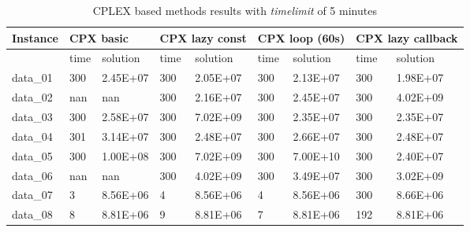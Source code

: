 \begin{table}[!h]
\caption{\textsc{CPLEX} based methods results with \textit{timelimit} of 5 minutes}
\begin{tabular}{lllllllll}
\hline
Instance & \multicolumn{2}{l}{\textbf{CPX basic}} & \multicolumn{2}{l}{\textbf{CPX lazy const}} & \multicolumn{2}{l}{\textbf{CPX loop (60s)}} & \multicolumn{2}{l}{\textbf{CPX lazy callback}} \\ \hline
         & time                & solution                & time                  & solution                 & time               & solution               & time                 & solution                \\ \hline
data\_01 & 300                 & 2.45E+07                & 300                   & 2.05E+07                 & 300                & 2.13E+07               & 300                  & 1.98E+07                \\
data\_02 & nan                 & nan                     & 300                   & 2.16E+07                 & 300                & 2.45E+07               & 300                  & 4.02E+09                \\
data\_03 & 300                 & 2.58E+07                & 300                   & 7.02E+09                 & 300                & 2.35E+07               & 300                  & 2.35E+07                \\
data\_04 & 301                 & 3.14E+07                & 300                   & 2.48E+07                 & 300                & 2.66E+07               & 300                  & 2.48E+07                \\
data\_05 & 300                 & 1.00E+08                & 300                   & 7.02E+09                 & 300                & 7.00E+10               & 300                  & 2.40E+07                \\
data\_06 & nan                 & nan                     & 300                   & 4.02E+09                 & 300                & 3.49E+07               & 300                  & 3.02E+09                \\
data\_07 & 3                   & 8.56E+06                & 4                     & 8.56E+06                 & 4                  & 8.56E+06               & 300                  & 8.66E+06                \\
data\_08 & 8                   & 8.81E+06                & 9                     & 8.81E+06                 & 7                  & 8.81E+06               & 192                  & 8.81E+06                \\

\end{tabular}
\end{table}
